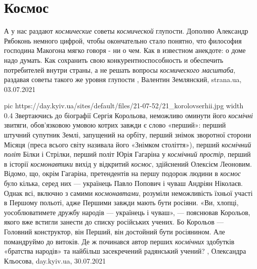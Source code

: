  
 
 
 
 
\chapter{Космос}

А у нас раздают \emph{космические} советы \emph{космической} глупости.  Дополню Александр
Рябоконь немного цифрой, чтобы окончательно стало понятно, что философия
господина Макогона мягко говоря - ни о чем.  Как в известном анекдоте: о доме
надо думать.  Как сохранить свою конкурентноспособность и обеспечить
потребителей внутри страны, а не решать вопросы \emph{космического масштаба}, раздавая
советы такого же уровня глупости
, 
Валентин Землянский, strana.ua, 03.07.2021

\ifcmt
  pic https://day.kyiv.ua/sites/default/files/21-07-52/21_korolovserhii.jpg
  width 0.4
\fi
Звертаючись до біографії Сергія Корольова, неможливо оминути його \emph{космічні}
звитяги, обов’язковою умовою котрих завжди є слово «перший»: перший штучний
супутник Землі, запущений на орбіту, перший знімок зворотної сторони Місяця
(преса всього світу називала його «Знімком століття»), перший \emph{космічний політ}
Білки і Стрілки, перший політ Юрія Гагаріна у \emph{космічний простір}, перший в
історії \emph{космонавтики} вихід у відкритий \emph{космос}, здійснений Олексієм Леоновим.
Відомо, що, окрім Гагаріна, претендентів на першу подорож людини в \emph{космос} було
кілька, серед них — українець Павло Попович і чуваш Андріян Ніколаєв. Однак
всі, включно з самими \emph{космонавтами}, розуміли неможливість їхньої участі в
Першому польоті, адже Першими завжди мають бути росіяни. «Ви, хлопці,
уособлюватимете дружбу народів — українець і чуваш», — пояснював Корольов,
якого вже встигли занести до списку російських учених. Бо Корольов — Головний
конструктор, він Перший, він достойний бути росіянином.
Але помандруймо до витоків. Де ж починався автор перших \emph{космічних} здобутків
«братства народів» та найбільш засекречений радянський учений?
, Олександра Кльосова, day.kyiv.ua, 30.07.2021

